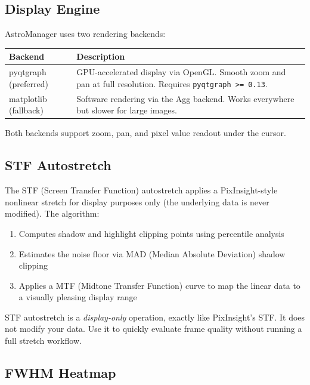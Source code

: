 \documentclass[11pt,a4paper]{article}
\begin{document}
\subsection{Display Engine}

AstroManager uses two rendering backends:

\begin{center}
\begin{tabular}{lp{8cm}}
\toprule
\textbf{Backend} & \textbf{Description} \\
\midrule
pyqtgraph (preferred) & GPU-accelerated display via OpenGL. Smooth zoom and pan at full resolution. Requires \texttt{pyqtgraph >= 0.13}. \\
matplotlib (fallback) & Software rendering via the Agg backend. Works everywhere but slower for large images. \\
\bottomrule
\end{tabular}
\end{center}

Both backends support zoom, pan, and pixel value readout under the cursor.

\subsection{STF Autostretch}

The STF (Screen Transfer Function) autostretch applies a PixInsight-style nonlinear stretch for display purposes only (the underlying data is never modified). The algorithm:

\begin{enumerate}
    \item Computes shadow and highlight clipping points using percentile analysis
    \item Estimates the noise floor via MAD (Median Absolute Deviation) shadow clipping
    \item Applies a MTF (Midtone Transfer Function) curve to map the linear data to a visually pleasing display range
\end{enumerate}

\begin{tipbox}
STF autostretch is a \emph{display-only} operation, exactly like PixInsight's STF. It does not modify your data. Use it to quickly evaluate frame quality without running a full stretch workflow.
\end{tipbox}

\subsection{FWHM Heatmap}
\end{document}
